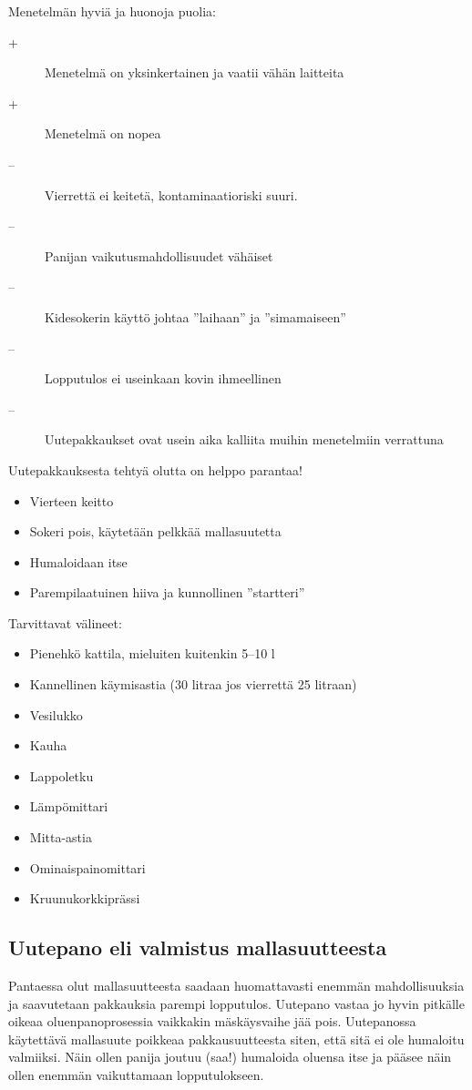 \documentclass[a4paper,11pt]{report}
\begin{document}
Menetelmän hyviä ja huonoja puolia:
\begin{description}
\item[+] Menetelmä on yksinkertainen ja vaatii vähän laitteita 
\item[+] Menetelmä on nopea
\item[--] Vierrettä ei keitetä, kontaminaatioriski suuri.
\item[--] Panijan vaikutusmahdollisuudet vähäiset
\item[--] Kidesokerin käyttö johtaa ''laihaan'' ja ''simamaiseen''
\item[--] Lopputulos ei useinkaan kovin ihmeellinen
\item[--] Uutepakkaukset ovat usein aika kalliita muihin menetelmiin verrattuna 
\end{description}
Uutepakkauksesta tehtyä olutta on helppo parantaa!
\begin{itemize}
\item Vierteen keitto
\item Sokeri pois, käytetään pelkkää mallasuutetta
\item Humaloidaan itse
\item Parempilaatuinen hiiva ja kunnollinen ''startteri''
\end{itemize}
Tarvittavat välineet:
\begin{itemize}
\item Pienehkö kattila, mieluiten kuitenkin 5--10 l
\item Kannellinen käymisastia (30 litraa jos vierrettä 25 litraan)
\item	Vesilukko
\item	Kauha
\item	Lappoletku
\item	Lämpömittari
\item	Mitta-astia
\item	Ominaispainomittari
\item	Kruunukorkkiprässi
\end{itemize}

\subsection{Uutepano eli valmistus mallasuutteesta}

Pantaessa olut mallasuutteesta saadaan huomattavasti enemmän mahdollisuuksia ja saavutetaan pakkauksia parempi lopputulos. Uutepano vastaa jo hyvin pitkälle oikeaa oluenpanoprosessia vaikkakin mäskäysvaihe jää pois. Uutepanossa käytettävä mallasuute poikkeaa pakkausuutteesta siten, että sitä ei ole humaloitu valmiiksi. Näin ollen panija joutuu (saa!) humaloida oluensa itse ja pääsee näin ollen enemmän vaikuttamaan lopputulokseen.
\end{document}
